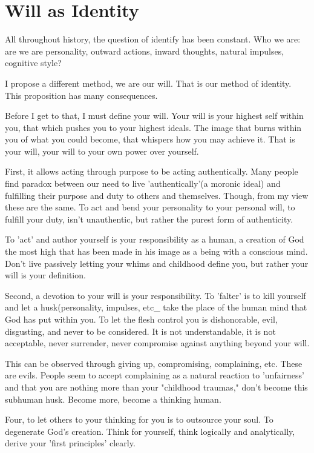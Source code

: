 \section{Will as Identity}
\par All throughout history, the question of identify has been constant. Who we are: are we are personality, outward actions, inward thoughts, natural impulses, cognitive style?
\par I propose a different method, we are our will. That is our method of identity. This proposition has many consequences.
\par Before I get to that, I must define your will. Your will is your highest self within you, that which pushes you to your highest ideals. The image that burns within you of what you could become, that whispers how you may achieve it. That is your will, your will to your own power over yourself.
\par First, it allows acting through purpose to be acting authentically. Many people find paradox between our need to live 'authentically'(a moronic ideal) and fulfilling their purpose and duty to others and themselves. Though, from my view these are the same. To act and bend your personality to your personal will, to fulfill your duty, isn't unauthentic, but rather the purest form of authenticity. 
\par To 'act' and author yourself is your responsibility as a human, a creation of God the most high that has been made in his image as a being with a conscious mind. Don't live passively letting your whims and childhood define you, but rather your will is your definition. 
\par Second, a devotion to your will is your  responsibility. To 'falter' is to kill yourself and let a husk(personality, impulses, etc_ take the place of the human mind that God has put within you. To let the flesh control you is dishonorable, evil, disgusting, and never to be considered. It is not understandable, it is not acceptable, never surrender, never compromise against anything beyond your will.
\par This can be observed through giving up, compromising, complaining, etc. These are evils. People seem to accept complaining as a natural reaction to 'unfairness' and that you are nothing more than your "childhood traumas," don't become this subhuman husk. Become more, become a thinking human.
\par Four, to let others to your thinking for you is to outsource your soul. To degenerate God's creation. Think for yourself, think logically and analytically, derive your 'first principles' clearly.
